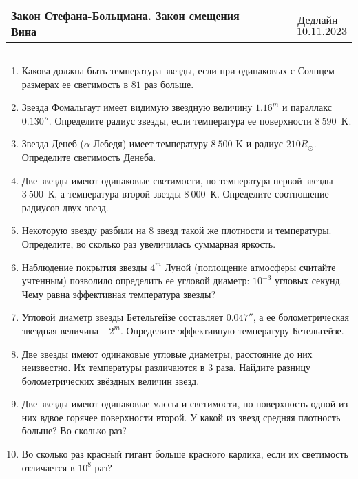 \documentclass[12pt]{article}
\begin{document}
 \begin{tabularx}{\textwidth}{Xr}
  {\Large \textbf{Закон Стефана-Больцмана. Закон смещения Вина}} & Дедлайн -- $10.11.2023$ \\
 \end{tabularx}
 \noindent\rule{\textwidth}{0.4pt}
 \begin{enumerate}
        \item Какова должна быть температура звезды, если при одинаковых с Солнцем размерах ее светимость в $81$ раз больше.

        \item Звезда Фомальгаут имеет видимую звездную величину $1.16^m$ и параллакс $0.130''$. Определите радиус звезды, если температура ее поверхности $8~590$~K.

        \item Звезда Денеб ($\alpha$ Лебедя) имеет температуру $8~500$ K и радиус $210 R_{\odot}$. Определите светимость Денеба.

        \item Две звезды имеют одинаковые светимости,	но температура первой звезды $3~500$~К, а температура второй звезды $8~000$~К. Определите соотношение радиусов двух звезд.

        \item Некоторую звезду разбили на $8$ звезд такой же плотности и температуры. Определите, во сколько раз увеличилась суммарная яркость.

        \item Наблюдение покрытия звезды $4^m$ Луной (поглощение атмосферы считайте учтенным) позволило определить ее угловой диаметр: $10^{-3}$ угловых секунд. Чему равна эффективная температура звезды?

        \item Угловой диаметр звезды Бетельгейзе составляет $0.047''$, а ее болометрическая звездная величина $-2^m$. Определите эффективную температуру Бетельгейзе.

        \item Две звезды имеют одинаковые угловые диаметры, расстояние до них неизвестно. Их температуры различаются в $3$ раза. Найдите разницу болометрических звёздных величин звезд.

        \item Две звезды имеют одинаковые массы и светимости, но поверхность одной из них вдвое горячее поверхности второй. У какой из звезд средняя плотность больше? Во сколько раз?

        \item Во сколько раз красный гигант больше красного карлика, если их светимость отличается в $10^8$ раз?
 \end{enumerate}
\end{document}
